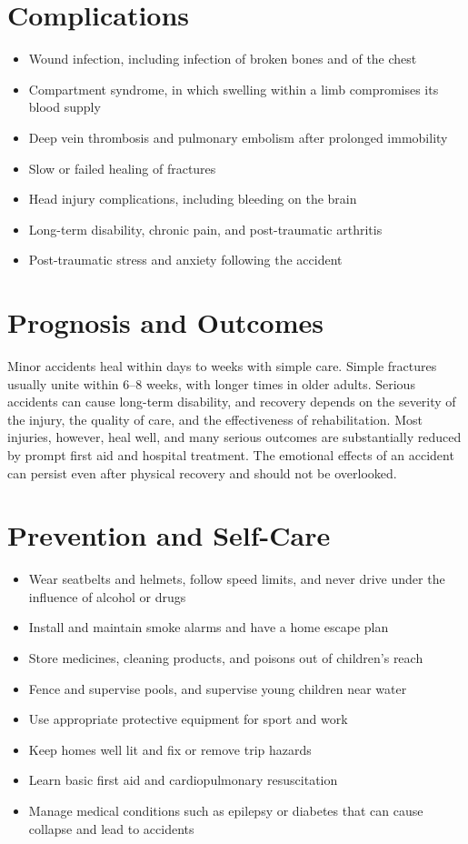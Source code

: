 \section*{Complications}
\begin{itemize}
    \item Wound infection, including infection of broken bones and of the chest
    \item Compartment syndrome, in which swelling within a limb compromises its blood supply
    \item Deep vein thrombosis and pulmonary embolism after prolonged immobility
    \item Slow or failed healing of fractures
    \item Head injury complications, including bleeding on the brain
    \item Long-term disability, chronic pain, and post-traumatic arthritis
    \item Post-traumatic stress and anxiety following the accident
\end{itemize}

\section*{Prognosis and Outcomes}
Minor accidents heal within days to weeks with simple care. Simple fractures usually unite within 6--8 weeks, with longer times in older adults. Serious accidents can cause long-term disability, and recovery depends on the severity of the injury, the quality of care, and the effectiveness of rehabilitation. Most injuries, however, heal well, and many serious outcomes are substantially reduced by prompt first aid and hospital treatment. The emotional effects of an accident can persist even after physical recovery and should not be overlooked.

\section*{Prevention and Self-Care}
\begin{itemize}
    \item Wear seatbelts and helmets, follow speed limits, and never drive under the influence of alcohol or drugs
    \item Install and maintain smoke alarms and have a home escape plan
    \item Store medicines, cleaning products, and poisons out of children's reach
    \item Fence and supervise pools, and supervise young children near water
    \item Use appropriate protective equipment for sport and work
    \item Keep homes well lit and fix or remove trip hazards
    \item Learn basic first aid and cardiopulmonary resuscitation
    \item Manage medical conditions such as epilepsy or diabetes that can cause collapse and lead to accidents
\end{itemize}

